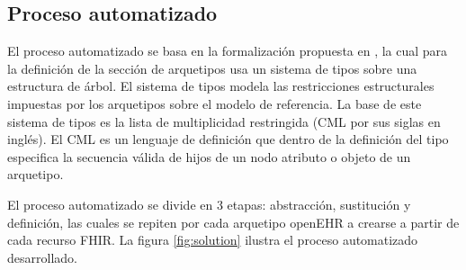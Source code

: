 \subsection{Proceso automatizado}

El proceso automatizado se basa en la formalización propuesta en \cite{Maldonado09}, la cual para la definición de la sección de arquetipos usa un sistema de tipos sobre una estructura de árbol. El sistema de tipos modela las restricciones estructurales impuestas por los arquetipos sobre el modelo de referencia. La base de este sistema de tipos es la lista de multiplicidad restringida (CML por sus siglas en inglés). El CML es un lenguaje de definición que dentro de la definición del tipo especifica la secuencia válida de hijos de un nodo atributo o objeto de un arquetipo.

El proceso automatizado se divide en 3 etapas: abstracción, sustitución y definición, las cuales se repiten por cada arquetipo openEHR a crearse a partir de cada recurso FHIR. La figura \ref{fig:solution} ilustra el proceso automatizado desarrollado.






